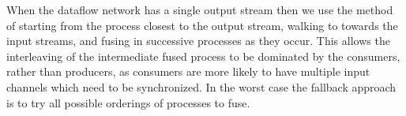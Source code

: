 When the dataflow network has a single output stream then we use the method of starting from the process closest to the output stream, walking to towards the input streams, and fusing in successive processes as they occur. This allows the interleaving of the intermediate fused process to be dominated by the consumers, rather than producers, as consumers are more likely to have multiple input channels which need to be synchronized. In the worst case the fallback approach is to try all possible orderings of processes to fuse.

